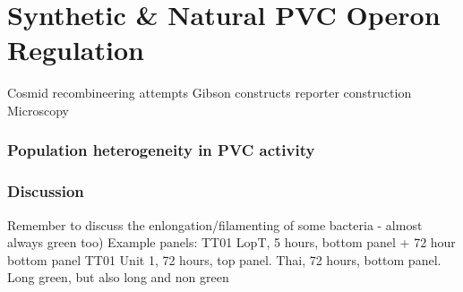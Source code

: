 \pagestyle{IHA-fancy-style}


\chapter{Synthetic \& Natural PVC Operon Regulation}\label{regulation}

Cosmid recombineering attempts
Gibson constructs
reporter construction
Microscopy


\subsection{Population heterogeneity in PVC activity}

%


\subsection{Discussion}
Remember to discuss the enlongation/filamenting of some bacteria - almost always green too)
Example panels:
TT01 LopT, 5 hours, bottom panel + 72 hour bottom panel
TT01 Unit 1, 72 hours, top panel.
Thai, 72 hours, bottom panel. Long green, but also long and non green
